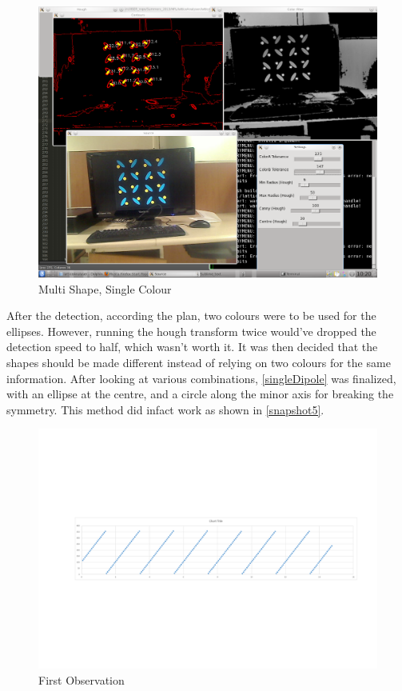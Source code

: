 		\begin{figure}[bth]
			\begin{center}
				\includegraphics[width=1.1\linewidth]{../../latticeAnalyser/snapshot5.png}
			\end{center}
		\caption[Multi Shape, Single Colour]{Multi Shape, Single Colour}
		\label{snapshot5}
		\end{figure}

		After the detection, according the plan, two colours were to be used for the ellipses. However, running the hough transform twice would've dropped the detection speed to half, which wasn't worth it. It was then decided that the shapes should be made different instead of relying on two colours for the same information. After looking at various combinations, \autoref{singleDipole} was finalized, with an ellipse at the centre, and a circle along the minor axis for breaking the symmetry. This method did infact work as shown in \autoref{snapshot5}.
		\par

		\begin{figure}[bth]
			\begin{center}
				\includegraphics[width=1.1\linewidth]{../../latticeAnalyser/testGraphs}
			\end{center}
		\caption[First Observation]{First Observation}
		\label{testGraphs}
		\end{figure}

